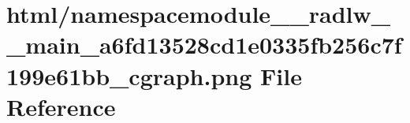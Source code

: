 \hypertarget{namespacemodule____radlw____main__a6fd13528cd1e0335fb256c7f199e61bb__cgraph_8png}{}\section{html/namespacemodule\+\_\+\+\_\+radlw\+\_\+\+\_\+main\+\_\+a6fd13528cd1e0335fb256c7f199e61bb\+\_\+cgraph.png File Reference}
\label{namespacemodule____radlw____main__a6fd13528cd1e0335fb256c7f199e61bb__cgraph_8png}
